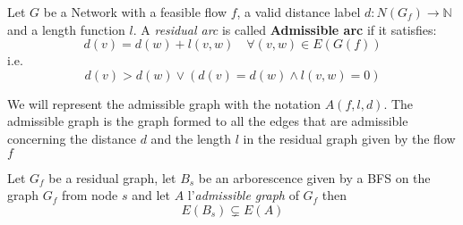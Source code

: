 \begin{definition}
    \label{AdmissibleGraph}
    Let $G$ be a Network with a feasible flow $f$, a valid distance label $d: N(G_f) \rightarrow \mathbb{N}$ 
    and a length function $l$.
    A \textit{residual arc} is called \textbf{Admissible arc} if it satisfies:
    \[d(v) = d(w) + l(v,w) \quad \forall (v,w) \in E(G(f))\]
    i.e.
    \[d(v) > d(w) \lor (d(v) = d(w) \land l(v,w) = 0)\]
    
    We will represent the admissible graph with the notation $A(f,l,d)$. The admissible graph is the graph formed to all the edges that are admissible concerning the distance $d$ and the length $l$ in the residual graph given by the flow $f$
\end{definition}


\begin{obs}{}{}
    Let $G_f$ be a residual graph, let $B_s$ be an arborescence given by a BFS on the graph $G_f$ from node $s$ and let $A$ l'\textit{admissible graph} of $G_f$ then
    \[E(B_s)\subsetneq E(A)\]
\end{obs}

